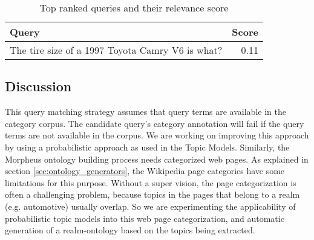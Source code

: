 \begin{table}[h]\footnotesize

\begin{tabular}{l | r}
Query & Score\\
\hline
The tire size of a 1997 Toyota Camry V6 is what? & 0.11\\ 
\hline
\end{tabular}        

\caption{Top ranked queries and their relevance score}
\label{tbl:ranked_queries}   

\end{table}


\subsection{Discussion}
This query matching strategy assumes that query terms are available in the
category corpus. The candidate query's category annotation will fail if the
query terms are not available in the corpus. We are working on improving this
approach by using a probabilistic approach as used in the Topic
Models\cite{Blei2003latentdirichlet}. Similarly, the Morpheus ontology building
process needs categorized web pages. As explained in section
\ref{sec:ontology_generators}, the Wikipedia page categories have some
limitations for this purpose. Without a super vision, the page categorization is
often a challenging problem, because topics in the pages that belong to a realm
(e.g. automotive) usually overlap. So we are experimenting the applicability of
probabilistic topic models into this web page categorization, and automatic
generation of a realm-ontology based on the topics being extracted.            
 


